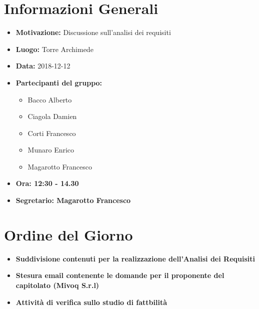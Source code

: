 \documentclass[a4paper, oneside, openany, dvipsnames, table]{article}
\begin{document}
\copertina{}


\newpage
\tableofcontents
\newpage

\section{Informazioni Generali}
\begin{itemize}
\item \textbf{Motivazione:} Discussione sull'analisi dei requisiti
\item \textbf{Luogo:} Torre Archimede
\item \textbf{Data:} 2018-12-12
\item \textbf{Partecipanti del gruppo:}
	\begin{itemize}
	\item Bacco Alberto
	\item Ciagola Damien
	\item Corti Francesco
	\item Munaro Enrico
	\item Magarotto Francesco
	\end{itemize} 
\item \textbf{Ora: 12:30 - 14.30}
\item \textbf{Segretario: Magarotto Francesco}
\end{itemize}

\section{Ordine del Giorno}
\begin{itemize}
\item \textbf{Suddivisione contenuti per la realizzazione dell'Analisi dei Requisiti}
\item \textbf{Stesura email contenente le domande per il proponente del capitolato (Mivoq S.r.l)}
\item \textbf{Attività di verifica sullo studio di fattbilità}
\end{itemize}
\end{document}
